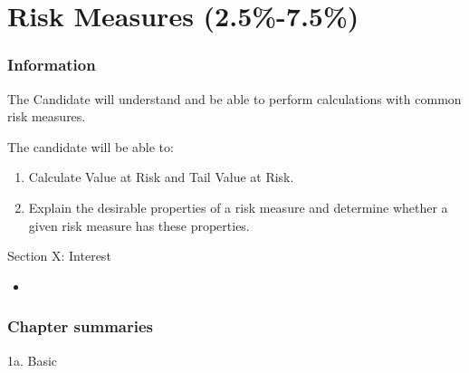 \chapter[Risk Measures]{Risk Measures (2.5\%-7.5\%)}

\subsection{Information}

\begin{distributions}[Objective]
The Candidate will understand and be able to perform calculations with common risk measures.
\end{distributions}

\begin{outcomes}
The candidate will be able to:
\begin{enumerate}[label = \alph*), leftmargin = *]
	\item	Calculate Value at Risk and Tail Value at Risk.
	\item	Explain the desirable properties of a risk measure and determine whether a given risk measure has these properties.
\end{enumerate}
\end{outcomes}

\begin{ASM_chapter}
Section X: Interest 
\begin{itemize}[leftmargin = *]
	\item	{}
\end{itemize}
\end{ASM_chapter}

\subsection{Chapter summaries}

\begin{CHPT_SUMM_AUTO}[label = {L.-1a}]{1a. Basic}

\end{CHPT_SUMM_AUTO}
